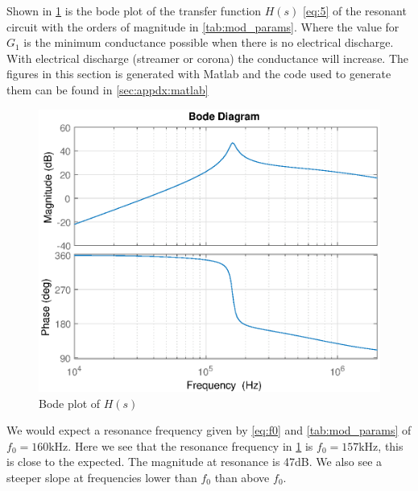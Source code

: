 Shown in \cref{fig:bode} is the bode plot of the transfer function $H(s)$ \cref{eq:5} of the resonant circuit with the orders of magnitude in \cref{tab:mod_params}. Where the value for $G_1$ is the minimum conductance possible when there is no electrical discharge. With electrical discharge (streamer or corona) the conductance will increase. The figures in this section is generated with Matlab and the code used to generate them can be found in \cref{sec:appdx:matlab}

\begin{figure}[H]
    \centering
    \includegraphics[width=\textwidth]{img/CoilRigBode.eps}
    \caption{Bode plot of $H(s)$}
    \label{fig:bode}
\end{figure}

We would expect a resonance frequency given by \cref{eq:f0} and \cref{tab:mod_params} of $f_0 = 160$kHz. Here we see that the resonance frequency in \cref{fig:bode} is $f_0 = 157$kHz, this is close to the expected. The magnitude at resonance is 47dB. We also see a steeper slope at frequencies lower than $f_0$ than above $f_0$.




